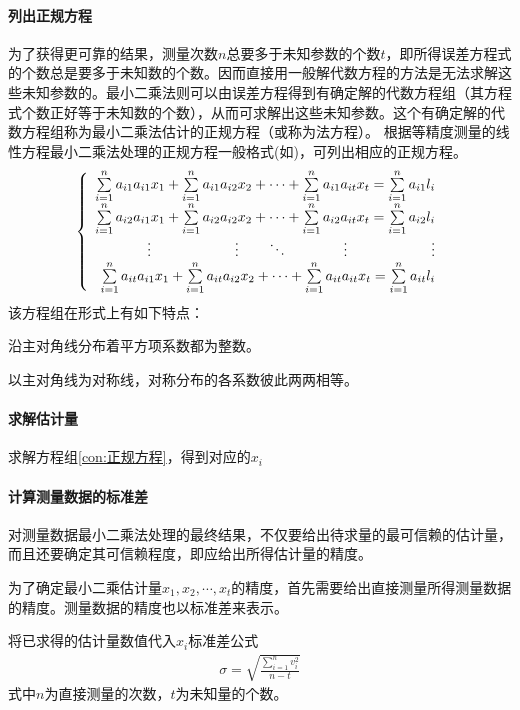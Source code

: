 \documentclass{ctexart}
\begin{document}
				\paragraph{列出正规方程}
					为了获得更可靠的结果，测量次数$n$总要多于未知参数的个数$t$，即所得误差方程式的个数总是要多于未知数的个数。因而直接用一般解代数方程的方法是无法求解这些未知参数的。最小二乘法则可以由误差方程得到有确定解的代数方程组（其方程式个数正好等于未知数的个数），从而可求解出这些未知参数。这个有确定解的代数方程组称为最小二乘法估计的正规方程（或称为法方程）。
					根据等精度测量的线性方程最小二乘法处理的正规方程一般格式(如)，可列出相应的正规方程。
					\begin{equation}
						\left \{
						\begin{array}{r}
							\sum \limits_{i=1}^n a_{i1}a_{i1}x_1+\sum \limits_{i=1}^n a_{i1}a_{i2}x_2+\cdots+\sum \limits_{i=1}^n a_{i1}a_{it}x_t=\sum \limits_{i=1}^n a_{i1}l_i\\
							\sum \limits_{i=1}^n a_{i2}a_{i1}x_1+\sum \limits_{i=1}^n a_{i2}a_{i2}x_2+\cdots+\sum \limits_{i=1}^n a_{i2}a_{it}x_t=\sum \limits_{i=1}^n a_{i2}l_i\\
							\vdots\qquad \qquad  \qquad \vdots \quad \quad \ddots\qquad \qquad \vdots \quad \qquad\quad \qquad \vdots\space\space\\
							\sum \limits_{i=1}^n a_{it}a_{i1}x_1+\sum \limits_{i=1}^n a_{it}a_{i2}x_2+\cdots+\sum \limits_{i=1}^n a_{it}a_{it}x_t=\sum \limits_{i=1}^n a_{it}l_i\\
						\end{array}
						\right.
						\label{con:正规方程}
					\end{equation}
					该方程组在形式上有如下特点：
					\begin{compactenum}
						\item 沿主对角线分布着平方项系数都为整数。
						\item 以主对角线为对称线，对称分布的各系数彼此两两相等。
					\end{compactenum}
				\paragraph{求解估计量}
					求解方程组\ref{con:正规方程}，得到对应的$x_i$
				\paragraph{计算测量数据的标准差}
					对测量数据最小二乘法处理的最终结果，不仅要给出待求量的最可信赖的估计量，而且还要确定其可信赖程度，即应给出所得估计量的精度。\par
					为了确定最小二乘估计量$x_1,x_2,\cdots,x_t$的精度，首先需要给出直接测量所得测量数据的精度。测量数据的精度也以标准差来表示。\par
					将已求得的估计量数值代入$x_i$标准差公式
					\begin{gather*}
						\sigma=\sqrt{\frac{\sum \limits_{i=1}^n v_i^2}{n-t}}
					\end{gather*}
					式中$n$为直接测量的次数，$t$为未知量的个数。
\end{document}
